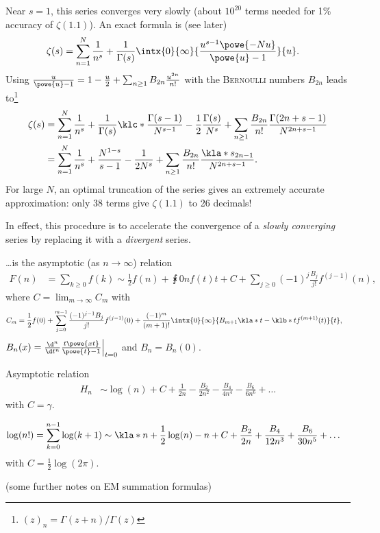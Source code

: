 \documentclass[english, parskip=full]{scrbook}
\newcommand{\definition}[2]{\begin{tcolorbox}[colback=colorbackgrounddefinition,colframe=colordefinition, breakable,enhanced,title=\textbf{#1}.]#2\end{tcolorbox}}
\newcommand{\example}[3]{\begin{tcolorbox}[colback=colorbackgroundexample,colframe=colorexample, breakable,enhanced,title={\textbf{#1}: #2.}]#3\end{tcolorbox}}
\begin{document}
\example{Riemann Zeta Function}{$\zeta(s) = \sum_{n\ge 1} \frac{1}{n^s}$}{
Near $s=1$, this series converges very slowly (about $10^{20}$ terms needed for 1\% accuracy of $\zeta(1.1)$).
An exact formula is (see later)
\begin{align}
\zeta(s) &= \sum_{n=1}^N\frac{1}{n^s} + \frac{1}{\Gamma(s)} \intx{0}{\infty}{\frac{u^{s-1} \powe{-Nu}}{\powe{u}-1}}{u}.
\end{align}
Using $\frac{u}{\powe{u}-1} = 1-\frac{u}{2} + \sum_{n\ge 1} B_{2n} \frac{u^{2n}}{n!}$ with the \textsc{Bernoulli} numbers $B_{2n}$ leads to\footnote{$(z)_n=\Gamma(z+n)/\Gamma(z)$}
\begin{align}
\zeta(s) &= \sum_{n=1}^N\frac{1}{n^s} + \frac{1}{\Gamma(s)} \klc*{\frac{\Gamma(s-1)}{N^{s-1}} - \frac{1}{2} \frac{\Gamma(s)}{N^s} + \sum_{n\ge 1} \frac{B_{2n}}{n!} \frac{\Gamma(2n+s-1)}{N^{2n+s-1}}}\\
&= \sum_{n=1}^N\frac{1}{n^s} + \frac{N^{1-s}}{s-1} - \frac{1}{2N^s} + \sum_{n\ge 1} \frac{B_{2n}}{n!} \frac{\kla*{s}_{2n-1}}{N^{2n+s-1}}.
\end{align}
For large $N$, an optimal truncation of the series gives an extremely accurate approximation: only 38 terms give $\zeta(1.1)$ to 26 decimals!
}
In effect, this procedure is to accelerate the convergence of a \emph{slowly converging} series by replacing it with a \emph{divergent} series.
\definition{Euler-Maclaurin Summation Formula}{
\dots is the asymptotic (as $n\rightarrow\infty$) relation
\begin{align}
F(n) &= \sum_{k\ge 0} f(k) \sim \frac{1}{2} f(n) + \intx{0}{n}{f(t)}{t} + C + \sum_{j\ge 0} (-1)^{j} \frac{B_j}{j!}f^{(j-1)}(n),
\end{align}
where $C=\lim_{m\rightarrow \infty} C_m$ with
\begin{align}
C_m &= \frac{1}{2}f(0) + \sum_{j=0}^{m-1} \frac{(-1)^{j-1}B_j}{j!} f^{(j-1)}(0) + \frac{(-1)^m}{(m+1)!} \intx{0}{\infty}{B_{m+1} \kla*{t - \klb*{t}} f^{(m+1)}(t)}{t},
\end{align}
$B_n(x) = \frac{\d^n}{\d t^n} \frac{t\powe{xt}}{\powe{t}-1}\Big\vert_{t=0}$ and $B_n=B_n(0)$.
}
\example{Harmonic series}{$H_n = \sum_{k=1}^n \frac{1}{k}$}{
Asymptotic relation
\begin{align}
H_n &\sim \log(n) + C + \frac{1}{2n} - \frac{B_2}{2n^2} - \frac{B_4}{4n^4} - \frac{B_6}{6n^6} + \dots
\end{align}
with $C=\gamma$.
}
\example{Stirling formula}{$\log(n!)$}{
\begin{align}
\log(n!) &= \sum_{k=0}^{n-1} \log(k+1) \sim \kla*{n + \frac{1}{2}} \log(n) - n + C + \frac{B_2}{2n} + \frac{B_4}{12n^3} + \frac{B_6}{30n^5} + \dots
\end{align}
with $C=\frac{1}{2}\log(2\pi)$.
}
(some further notes on EM summation formulas)
\end{document}
